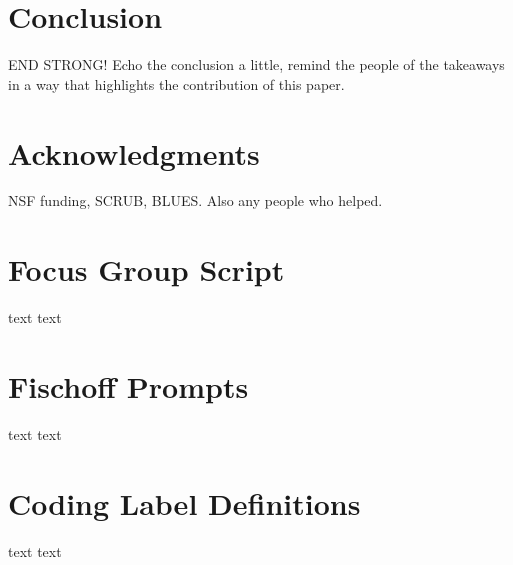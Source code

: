 \documentclass{acm_proc_article-sp}
\begin{document}

\section{Conclusion}
END STRONG! Echo the conclusion a little, remind the people of the takeaways in a way that highlights the contribution of this paper. 



\section{Acknowledgments}
NSF funding, SCRUB, BLUES. Also any people who helped.







\appendix
\section{Focus Group Script}
\label{sec:script}

text text

\section{Fischoff Prompts}
\label{sec:prompt}

text text 

\section{Coding Label Definitions}
\label{sec:coding}

text text

\balancecolumns

\end{document}

